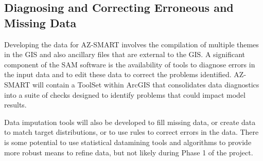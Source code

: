 \subsection{Diagnosing and Correcting Erroneous and Missing Data}

Developing the data for AZ-SMART involves the compilation of multiple themes in the GIS and also ancillary files that are external to the GIS.  A significant component of the SAM software is the availability of tools to diagnose errors in the input data and to edit these data to correct the problems identified.  AZ-SMART will contain a ToolSet within ArcGIS that consolidates data diagnostics into a suite of checks designed to identify problems that could impact model results.

Data imputation tools will also be developed to fill missing data, or create data to match target distributions, or to use rules to correct errors in the data.  There is some potential to use statistical datamining tools and algorithms to provide more robust means to refine data, but not likely during Phase 1 of the project.
